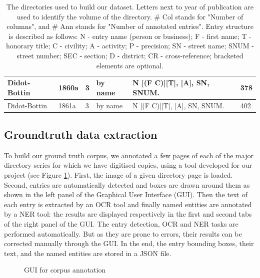 \begin{table}[h!]
{\begin{tabular}{|l|l|l|l|l|l|}
\\ \hline
Didot-Bottin & 1860a	& 3	& by name & N [(F \textbar C)][T], [A], SN, SNUM. & 378
\\ \hline
Didot-Bottin & 1861a	& 3	& by name & N [(F \textbar C)][T], [A], SN, SNUM. & 402
\\ \hline
\end{tabular}%
}
\caption{The directories used to build our dataset. Letters next to year of publication are used to identify the volume of the directory. \# Col stands for "Number of columns", and \# Ann stands for "Number of annotated entries". Entry structure is described as follows: N - entry name (person or business); F - first name; T - honorary title; C - civility; A - activity; P - precision; SN - street name; SNUM - street number; SEC - section; D - district; CR - cross-reference; bracketed elements are optional.}
\label{tab:directories}
\end{table}

\subsection{Groundtruth data extraction}

To build our ground truth corpus, we annotated a few pages of each of the major directory series for which we have digitised copies, using a tool developed for our project (see Figure \ref{fig:annotator}). First, the image of a given directory page is loaded. Second, entries are automatically detected and boxes are drawn around them as shown in the left panel of the Graphical User Interface (GUI). Then the text of each entry is extracted by an OCR tool and finally named entities are annotated by a NER tool: the results are displayed respectively in the first and second tabs of the right panel of the GUI. The entry detection, OCR and NER tasks are performed automatically. But as they are prone to errors, their results can be corrected manually through the GUI. In the end, the entry bounding boxes, their text, and the named entities are stored in a JSON file.

\begin{figure}[htb!]
	  \caption{\label{fig:annotator} GUI for corpus annotation}
\end{figure}

